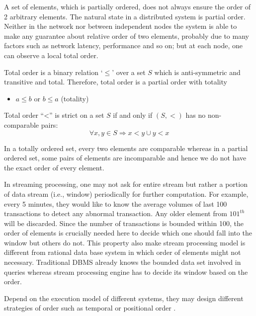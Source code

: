 A set of elements, which is partially ordered, does not always ensure the order of  2 arbitrary elements. The natural state in a distributed system is partial order. Neither in the network nor between independent nodes the system is able to make any guarantee about relative order of two elements, probably due to many factors such as network latency, performance and so on; but at each node, one can observe a local total order.

\begin{defi}
 Total order \citep{Simovici:2008} is a binary relation `$\leq$' over a set $S$ which is anti-symmetric and transitive and total. Therefore, total order is a partial order with totality
 
 \begin{itemize}
	 \item $a \leq b$ or $b \leq a$  (totality)
\end{itemize}
\end{defi}

Total order ``<'' is strict on a set $S$ if and only if $(S, <)$ has no non-comparable pairs:
\begin{equation}
 \forall x, y \in S \Rightarrow  x < y \cup y < x 
\end{equation} 


In a totally ordered set, every two elements are comparable whereas in a partial ordered set, some pairs of elements are incomparable and hence we do not have the exact order of every element.

In streaming processing, one may not ask for entire stream  but rather a portion of data stream (i.e., window) periodically for further computation. For example, every 5 minutes, they would like to know the average volumes of last 100 transactions to detect any abnormal transaction. Any older element from $101^{th}$ will be discarded. Since the number of transactions is bounded within 100, the order of elements is crucially needed here to decide which one should fall into the window but others do not. This property also make stream processing model is different from rational data base system in which order of elements might not necessary. Traditional DBMS already knows the bounded data set involved in queries whereas stream processing engine has to decide its window based on the order.

Depend on the execution model of different systems, they may design different strategies of order such as temporal or positional order \citep{Petit:2012}.

